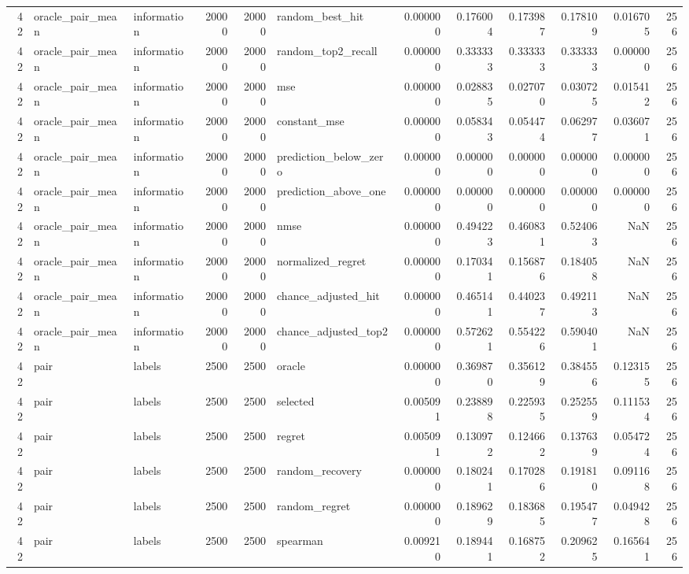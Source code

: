 \begin{tabular}{rllrrlrrrrrr}
42 & oracle_pair_mean & information & 20000 & 20000 & random_best_hit & 0.000000 & 0.176004 & 0.173987 & 0.178109 & 0.016705 & 256 \\
42 & oracle_pair_mean & information & 20000 & 20000 & random_top2_recall & 0.000000 & 0.333333 & 0.333333 & 0.333333 & 0.000000 & 256 \\
42 & oracle_pair_mean & information & 20000 & 20000 & mse & 0.000000 & 0.028835 & 0.027070 & 0.030725 & 0.015412 & 256 \\
42 & oracle_pair_mean & information & 20000 & 20000 & constant_mse & 0.000000 & 0.058343 & 0.054474 & 0.062977 & 0.036071 & 256 \\
42 & oracle_pair_mean & information & 20000 & 20000 & prediction_below_zero & 0.000000 & 0.000000 & 0.000000 & 0.000000 & 0.000000 & 256 \\
42 & oracle_pair_mean & information & 20000 & 20000 & prediction_above_one & 0.000000 & 0.000000 & 0.000000 & 0.000000 & 0.000000 & 256 \\
42 & oracle_pair_mean & information & 20000 & 20000 & nmse & 0.000000 & 0.494223 & 0.460831 & 0.524063 & NaN & 256 \\
42 & oracle_pair_mean & information & 20000 & 20000 & normalized_regret & 0.000000 & 0.170341 & 0.156876 & 0.184058 & NaN & 256 \\
42 & oracle_pair_mean & information & 20000 & 20000 & chance_adjusted_hit & 0.000000 & 0.465141 & 0.440237 & 0.492113 & NaN & 256 \\
42 & oracle_pair_mean & information & 20000 & 20000 & chance_adjusted_top2 & 0.000000 & 0.572621 & 0.554226 & 0.590401 & NaN & 256 \\
42 & pair & labels & 2500 & 2500 & oracle & 0.000000 & 0.369870 & 0.356129 & 0.384556 & 0.123155 & 256 \\
42 & pair & labels & 2500 & 2500 & selected & 0.005091 & 0.238898 & 0.225935 & 0.252559 & 0.111534 & 256 \\
42 & pair & labels & 2500 & 2500 & regret & 0.005091 & 0.130972 & 0.124662 & 0.137639 & 0.054724 & 256 \\
42 & pair & labels & 2500 & 2500 & random_recovery & 0.000000 & 0.180241 & 0.170286 & 0.191810 & 0.091168 & 256 \\
42 & pair & labels & 2500 & 2500 & random_regret & 0.000000 & 0.189629 & 0.183685 & 0.195477 & 0.049428 & 256 \\
42 & pair & labels & 2500 & 2500 & spearman & 0.009210 & 0.189441 & 0.168752 & 0.209625 & 0.165641 & 256 \\

\end{tabular}
